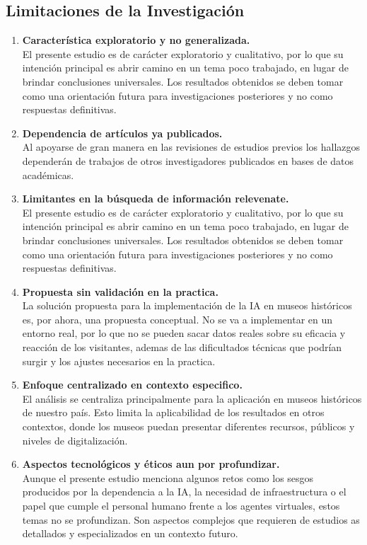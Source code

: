 \documentclass[pdflatex,sn-mathphys-num]{sn-jnl}%
\theoremstyle{thmstyleone}%
\theoremstyle{thmstyletwo}%
\theoremstyle{thmstylethree}%
\begin{document}
\subsection{Limitaciones de la Investigación}
\begin{enumerate}
    \item \textbf{Característica exploratorio y no generalizada. } \\
    El presente estudio es de carácter exploratorio y cualitativo, por lo que su intención principal es abrir camino en un tema poco trabajado, en lugar de brindar conclusiones universales. Los resultados obtenidos se deben tomar como una orientación futura para investigaciones posteriores y no como respuestas definitivas. 
    \item \textbf{Dependencia de artículos ya publicados. } \\
    Al apoyarse de gran manera en las revisiones de estudios previos los hallazgos dependerán de trabajos de otros investigadores publicados en bases de datos académicas. 
    \item \textbf{Limitantes en la búsqueda de información relevenate. }\\
    El presente estudio es de carácter exploratorio y cualitativo, por lo que su intención principal es abrir camino en un tema poco trabajado, en lugar de brindar conclusiones universales. Los resultados obtenidos se deben tomar como una orientación futura para investigaciones posteriores y no como respuestas definitivas.
    \item \textbf{Propuesta sin validación en la practica.  }\\
    La solución propuesta para la implementación de la IA en museos históricos es, por ahora, una propuesta conceptual. No se va a implementar en un entorno real, por lo que no se pueden sacar datos reales sobre su eficacia y reacción de los visitantes, ademas de las dificultados técnicas que podrían surgir y los ajustes necesarios en la practica. 
    \item \textbf{Enfoque centralizado en contexto especifico. }\\
    El análisis se centraliza principalmente para la aplicación en museos históricos de nuestro país. Esto limita la aplicabilidad de los resultados en otros contextos, donde los museos puedan presentar diferentes recursos, públicos y niveles de digitalización. 
    \item \textbf{Aspectos tecnológicos y éticos aun por profundizar. }\\
    Aunque el presente estudio menciona algunos retos como los sesgos producidos por la dependencia a la IA, la necesidad de infraestructura o el papel que cumple el personal humano frente a los agentes virtuales, estos temas no se profundizan. Son aspectos complejos que requieren de estudios as detallados y especializados en un contexto futuro. 
\end{enumerate}
\end{document}
